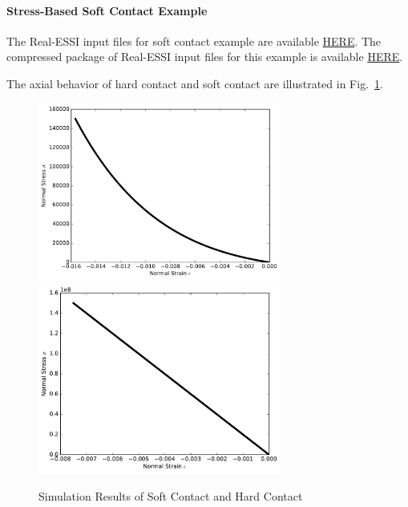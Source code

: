 \paragraph{Stress-Based Soft Contact Example}
The Real-ESSI input files for soft contact example are available 
\href{http://sokocalo.engr.ucdavis.edu/~jeremic/lecture_notes_online_material/_Chapter_Short_Course_Examples/short-course-examples/Day3/Contact_Examples/axial/SoftContact_Elastic_Perfectly_Plastic_Shear_Model}{HERE}. 
The compressed package of Real-ESSI input files for this example is available 
\href{http://sokocalo.engr.ucdavis.edu/~jeremic/lecture_notes_online_material/_Chapter_Short_Course_Examples/short-course-examples/Day3/Contact_Examples/axial/SoftContact_Elastic_Perfectly_Plastic_Shear_Model/_all_files_packaged_for_SoftContact_Elastic_Perfectly_Plastic_Shear_Model.tar.gz}{HERE}. 


The axial behavior of hard contact and soft contact are illustrated in Fig.~\ref{fig_soft_hard_contact}.



\begin{figure}[H]
  \centering
  \includegraphics[width = 8cm]{./Figure-files/Day3/Contact_Examples/softcontact.pdf}
  \includegraphics[width = 8cm]{./Figure-files/Day3/Contact_Examples/hardcontact.pdf}
  \caption{Simulation Results of Soft Contact and Hard Contact}
  \label{fig_soft_hard_contact}
\end{figure}






